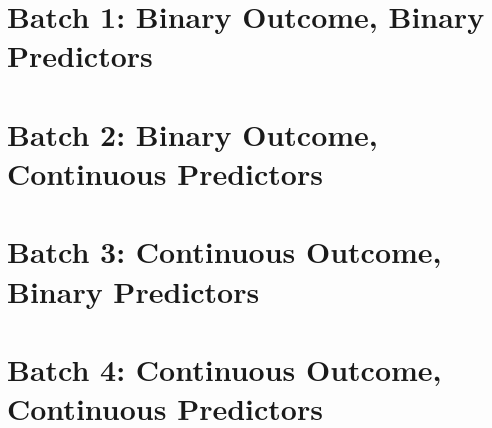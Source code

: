 
\section[Binary Y, binary X]{Batch 1: Binary Outcome, Binary Predictors}

 \newpage 
 \newpage
 \newpage



\section[Binary Y, continuous X]{Batch 2: Binary Outcome, Continuous Predictors}

 \newpage 
 \newpage
 \newpage

 \newpage 

\section[Continuous Y, binary X]{Batch 3: Continuous Outcome, Binary Predictors}

 \newpage 
 \newpage
 \newpage

\section[Continuous Y, continuous X]{Batch 4: Continuous Outcome, Continuous Predictors}
 \newpage 
 \newpage 
 \newpage


